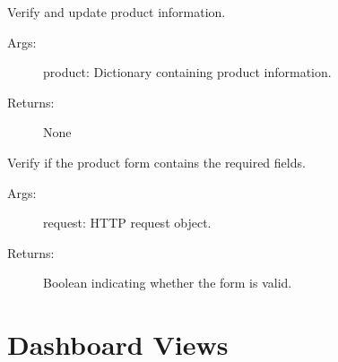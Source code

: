 \documentclass[letterpaper,10pt,english]{sphinxmanual}
\begin{document}

\begin{fulllineitems}
\label{\detokenize{modules/views:Inventory.views.VerifyAndUpdate}}
\sphinxAtStartPar
Verify and update product information.
\begin{description}
\item[{Args:}] \leavevmode
\sphinxAtStartPar
product: Dictionary containing product information.

\item[{Returns:}] \leavevmode
\sphinxAtStartPar
None

\end{description}

\end{fulllineitems}


\begin{fulllineitems}
\label{\detokenize{modules/views:Inventory.views.VerifyProductForm}}
\sphinxAtStartPar
Verify if the product form contains the required fields.
\begin{description}
\item[{Args:}] \leavevmode
\sphinxAtStartPar
request: HTTP request object.

\item[{Returns:}] \leavevmode
\sphinxAtStartPar
Boolean indicating whether the form is valid.

\end{description}

\end{fulllineitems}



\chapter{Dashboard Views}
\label{\detokenize{modules/views:module-Dashboard.views}}\label{\detokenize{modules/views:dashboard-views}}
\end{document}
